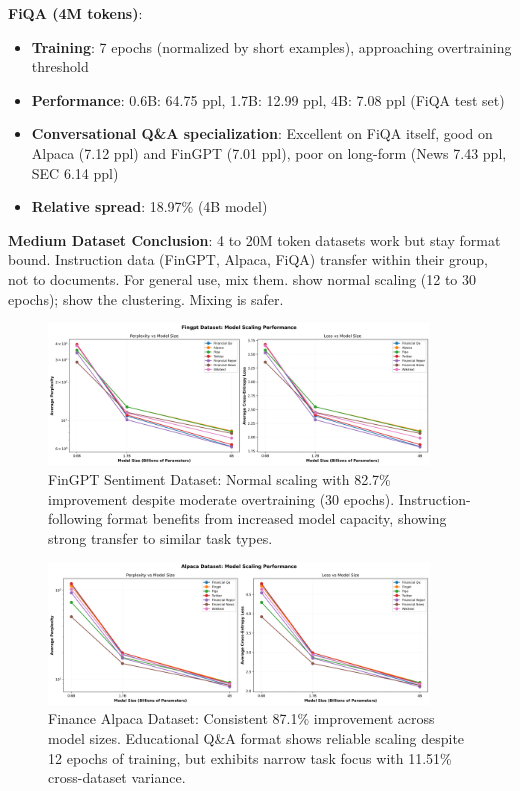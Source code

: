 \textbf{FiQA (4M tokens)}:
\begin{itemize}
\item \textbf{Training}: 7 epochs (normalized by short examples), approaching overtraining threshold
\item \textbf{Performance}: 0.6B: 64.75 ppl, 1.7B: 12.99 ppl, 4B: 7.08 ppl (FiQA test set)
\item \textbf{Conversational Q\&A specialization}: Excellent on FiQA itself, good on Alpaca (7.12 ppl) and FinGPT (7.01 ppl), poor on long-form (News 7.43 ppl, SEC 6.14 ppl)
\item \textbf{Relative spread}: 18.97\% (4B model)
\end{itemize}

\textbf{Medium Dataset Conclusion}: 4 to 20M token datasets work but stay format bound. Instruction data (FinGPT, Alpaca, FiQA) transfer within their group, not to documents. For general use, mix them.  show normal scaling (12 to 30 epochs);  show the clustering. Mixing is safer.

\begin{figure}[h]
\centering
\includegraphics[width=0.9\textwidth]{figures/scaling_fingpt.png}
\caption[FinGPT Sentiment Dataset: Scaling Behavior]{FinGPT Sentiment Dataset: Normal scaling with 82.7\% improvement despite moderate overtraining (30 epochs). Instruction-following format benefits from increased model capacity, showing strong transfer to similar task types.}
\label{fig:scaling_fingpt}
\end{figure}

\begin{figure}[h]
\centering
\includegraphics[width=0.9\textwidth]{figures/scaling_alpaca.png}
\caption[Finance Alpaca Dataset: Scaling Behavior]{Finance Alpaca Dataset: Consistent 87.1\% improvement across model sizes. Educational Q\&A format shows reliable scaling despite 12 epochs of training, but exhibits narrow task focus with 11.51\% cross-dataset variance.}
\label{fig:scaling_alpaca}
\end{figure}

